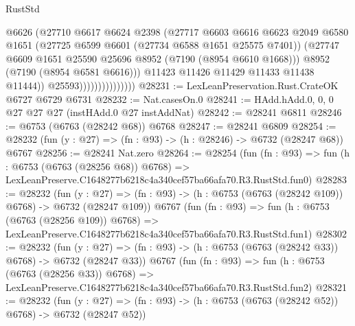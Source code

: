 \begin{lexlean}{RustStd}
\begin{coremodule}
                                    @6626
                                    (@27710
                                      @6617
                                      @6624
                                      @2398
                                      (@27717
                                        @6603
                                        @6616
                                        @6623
                                        @2049
                                        @6580
                                        @1651
                                        (@27725 @6599 @6601 (@27734 @6588 @1651 @25575 @7401))
                                        (@27747
                                          @6609
                                          @1651
                                          @25590
                                          @25696
                                          @8952
                                          (@7190 (@8954 @6610 @1668)))
                                        @8952
                                        (@7190 (@8954 @6581 @6616)))
                                      @11423
                                      @11426
                                      @11429
                                      @11433
                                      @11438
                                      @11444))
                                  @25593)))))))))))))))
@28231 := LexLeanPreservation.Rust.CrateOK @6727 @6729 @6731
@28232 := Nat.casesOn.{0}
@28241 := HAdd.hAdd.{0, 0, 0} @27 @27 @27 (instHAdd.{0} @27 instAddNat)
@28242 := @28241 @6811
@28246 := @6753 (@6763 (@28242 @68)) @6768
@28247 := @28241 @6809
@28254 := @28232 (fun (y : @27) => (fn : @93) -> (h : @28246) -> @6732 (@28247 @68)) @6767
@28256 := @28241 Nat.zero
@28264 := @28254
    (fun (fn : @93) =>
    fun (h : @6753 (@6763 (@28256 @68)) @6768) =>
    LexLeanPreserve.C1648277b6218c4a340cef57ba66afa70.R3.RustStd.fun0)
@28283 := @28232
    (fun (y : @27) => (fn : @93) -> (h : @6753 (@6763 (@28242 @109)) @6768) -> @6732 (@28247 @109))
    @6767
    (fun (fn : @93) =>
    fun (h : @6753 (@6763 (@28256 @109)) @6768) =>
    LexLeanPreserve.C1648277b6218c4a340cef57ba66afa70.R3.RustStd.fun1)
@28302 := @28232
    (fun (y : @27) => (fn : @93) -> (h : @6753 (@6763 (@28242 @33)) @6768) -> @6732 (@28247 @33))
    @6767
    (fun (fn : @93) =>
    fun (h : @6753 (@6763 (@28256 @33)) @6768) =>
    LexLeanPreserve.C1648277b6218c4a340cef57ba66afa70.R3.RustStd.fun2)
@28321 := @28232
    (fun (y : @27) => (fn : @93) -> (h : @6753 (@6763 (@28242 @52)) @6768) -> @6732 (@28247 @52))

\end{coremodule}
\end{lexlean}

